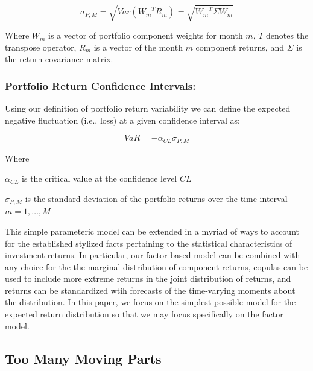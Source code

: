 \documentclass[]{article}
\newenvironment{Shaded}{\begin{snugshade}}{\end{snugshade}}
\newcommand{\KeywordTok}[1]{\textcolor[rgb]{0.13,0.29,0.53}{\textbf{{#1}}}}
\newcommand{\StringTok}[1]{\textcolor[rgb]{0.31,0.60,0.02}{{#1}}}
\newcommand{\NormalTok}[1]{{#1}}
\begin{document}
\[\sigma_{P,M}=\sqrt{Var\left( {W_{m}}^{T} R_{m} \right)}=\sqrt{{W_{m}}^T\Sigma W_{m}}\]

Where \(W_{m}\) is a vector of portfolio component weights for month
\(m\), \(T\) denotes the transpose operator, \(R_{m}\) is a vector of
the month \(m\) component returns, and \(\Sigma\) is the return
covariance matrix.

\begin{Shaded}
\end{Shaded}

\subsubsection{Portfolio Return Confidence
Intervals:}\label{portfolio-return-confidence-intervals}

Using our definition of portfolio return variability we can define the
expected negative fluctuation (i.e., loss) at a given confidence
interval as:

\[VaR = -\alpha_{CL}\sigma_{P,M}\]

Where

\(\alpha_{CL}\) is the critical value at the confidence level \(CL\)

\(\sigma_{P,M}\) is the standard deviation of the portfolio returns over
the time interval \(m=1, \dots, M\)

This simple parameteric model can be extended in a myriad of ways to
account for the established stylized facts pertaining to the statistical
characteristics of investment returns. In particular, our factor-based
model can be combined with any choice for the the marginal distribution
of component returns, copulas can be used to include more extreme
returns in the joint distribution of returns, and returns can be
standardized wtih forecasts of the time-varying moments about the
distribution. In this paper, we focus on the simplest possible model for
the expected return distribution so that we may focus specifically on
the factor model.

\subsection{Too Many Moving Parts}\label{too-many-moving-parts}
\end{document}
